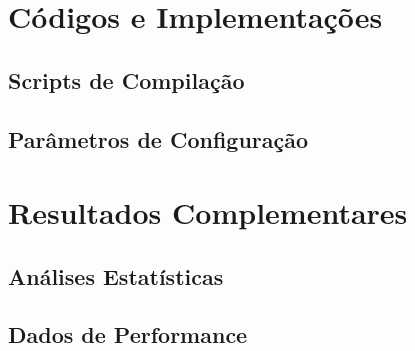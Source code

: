 \chapter{Códigos e Implementações}


\section{Scripts de Compilação}


\section{Parâmetros de Configuração}


\chapter{Resultados Complementares}


\section{Análises Estatísticas}


\section{Dados de Performance}

